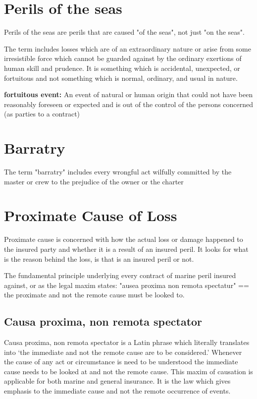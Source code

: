 \section{Perils of the seas}

Perils of the seas are perils that are caused "of the seas", not just "on the seas". \cite{wilsonsonsvxanoth}

The term includes losses which are of an extraordinary nature or arise  from some irresistible force which cannot be guarded against by the ordinary exertions of human skill and prudence. It is something which is accidental, unexpected, or fortuitous and not something which is normal, ordinary, and usual in nature.

\textbf{fortuitous event:} An event of natural or human origin that could not have been reasonably foreseen or expected and is out of the control of the persons concerned (as parties to a contract)

\section{Barratry}

The term "barratry" includes every wrongful act wilfully committed by the master or crew to the prejudice of the owner or the charter \cite{marineInsuranceAct55}

\section{Proximate Cause of Loss}

Proximate cause is concerned with how the actual loss or damage happened to the insured party and whether it is a result of an insured peril. It looks for what is the reason behind the loss, is that is an insured peril or not.

The fundamental principle underlying every contract of marine peril insured against, or as the legal maxim states: "ausea proxima non remota spectatur" == the proximate and not the remote cause must be looked to. \cite{marineInsuranceAct55}


\subsection{Causa proxima, non remota spectator}

Causa proxima, non remota spectator is a Latin phrase which literally translates into ‘the immediate and not the remote cause are to be considered.’ Whenever the cause of any act or circumstance is need to be understood the immediate cause needs to be looked at and not the remote cause. This maxim of causation is applicable for both marine and general insurance. It is the law which gives emphasis to the immediate cause and not the remote occurrence of events.


